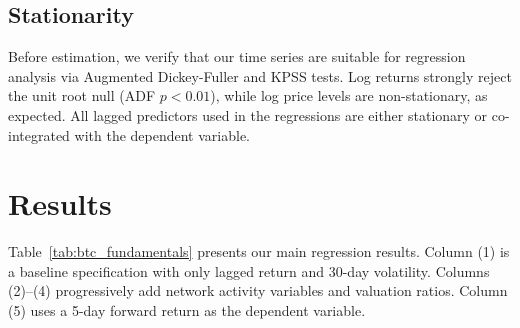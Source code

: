 \documentclass[12pt,a4paper]{article}
\begin{document}
\begin{table}[htbp]
\centering
\caption{Summary Statistics: BTC Daily Data (2013--2025)}
\label{tab:btc_summary}
\end{table}

\subsection{Stationarity}

Before estimation, we verify that our time series are suitable for
regression analysis via Augmented Dickey-Fuller and KPSS tests.
Log returns strongly reject the unit root null (ADF $p < 0.01$),
while log price levels are non-stationary, as expected.
All lagged predictors used in the regressions are either stationary
or co-integrated with the dependent variable.

\section{Results}

Table~\ref{tab:btc_fundamentals} presents our main regression results.
Column (1) is a baseline specification with only lagged return and
30-day volatility. Columns (2)--(4) progressively add network activity
variables and valuation ratios. Column (5) uses a 5-day forward return
as the dependent variable.
\end{document}
